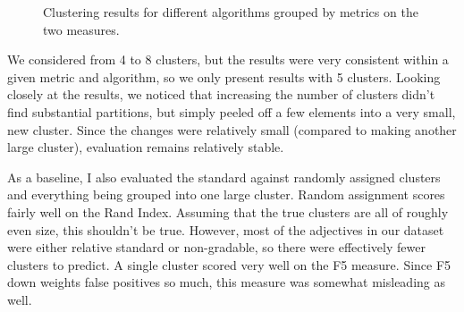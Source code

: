 \documentclass[11pt]{amsart}
\begin{document}
\begin{figure}
	\caption{Clustering results for different algorithms grouped by metrics on the two measures.}
\end{figure}
		
We considered from 4 to 8 clusters, but the results were very consistent within a given metric and algorithm, so we only present results with 5 clusters. Looking closely at the results, we noticed that increasing the number of clusters didn't find substantial partitions, but simply peeled off a few elements into a very small, new cluster. Since the changes were relatively small (compared to making another large cluster), evaluation remains relatively stable.

As a baseline, I also evaluated the standard against randomly assigned clusters and everything being grouped into one large cluster. Random assignment scores fairly well on the Rand Index. Assuming that the true clusters are all of roughly even size, this shouldn't be true. However, most of the adjectives in our dataset were either relative standard or non-gradable, so there were effectively fewer clusters to predict. A single cluster scored very well on the F5 measure. Since F5 down weights false positives so much, this measure was somewhat misleading as well.
\end{document}
